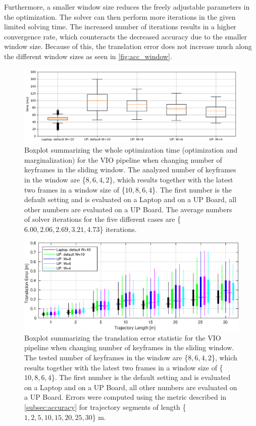 Furthermore, a smaller window size reduces the freely adjustable parameters in 
the optimization. The solver can then perform more iterations in the given 
limited solving time. The increased number of iterations results in a higher 
convergence rate, which counteracts the decreased accuracy due to the smaller 
window size. Because of this, the translation error does not increase much 
along the different window sizes as seen in \autoref{fig:acc_window}.
\begin{figure}[H]
\centering
\includegraphics[width=1\textwidth]{images/time_window}
\caption{Boxplot summarizing the whole optimization time (optimization and 
marginalization) for the \ac{VIO} pipeline when changing number of keyframes in 
the sliding window. The analyzed number of keyframes in the window are \{$8, 6, 
4, 2$\}, which results together with the latest two frames in a window size of 
\{$10, 8, 6, 4$\}. The first number is the default setting and is evaluated on 
a Laptop and on a UP Board, all other numbers are evaluated on a UP Board.  
The average numbers of solver iterations for the five 
different cases are \{$6.00, 2.06, 2.69, 3.21, 4.73$\} iterations.}
\label{fig:time_window}
\end{figure}
\begin{figure}[H]
\centering
\includegraphics[width=1\textwidth]{images/acc_window}
\caption{Boxplot summarizing the translation error statistic for the \ac{VIO}
pipeline when changing number of keyframes in the sliding window. The tested 
number of keyframes in the window are \{$8, 6, 4, 2$\}, which results together 
with the latest two frames in a window size of \{$10, 8, 6, 4$\}. The first 
number is the default setting and is evaluated on a Laptop and on a UP Board, 
all other numbers are evaluated on a UP Board. 
Errors were computed using the metric described in \autoref{subsec:accuracy} 
for trajectory segments of length \{$1, 2, 5, 10, 15, 20, 25, 30$\} m. }
\label{fig:acc_window}
\end{figure}

